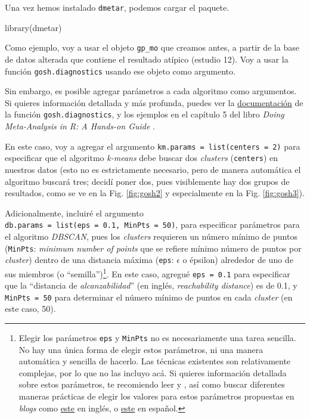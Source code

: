 \documentclass[
  bookmarksnumbered]{article}
\newenvironment{Shaded}{\begin{snugshade}}{\end{snugshade}}
\newcommand{\FunctionTok}[1]{\textcolor[rgb]{0.39,0.29,0.61}{#1}}
\newcommand{\NormalTok}[1]{\textcolor[rgb]{0.12,0.11,0.11}{#1}}
\begin{document}
Una vez hemos instalado \texttt{dmetar}, podemos cargar el paquete.

\begin{Shaded}
\begin{Highlighting}[]
\FunctionTok{library}\NormalTok{(dmetar)}
\end{Highlighting}
\end{Shaded}

Como ejemplo, voy a usar el objeto \texttt{gp\_mo} que creamos antes, a partir de la base de datos alterada que contiene el resultado atípico (estudio 12). Voy a usar la función \texttt{gosh.diagnostics} usando ese objeto como argumento.

Sin embargo, es posible agregar parámetros a cada algoritmo como argumentos. Si quieres información detallada y más profunda, puedes ver la \href{https://dmetar.protectlab.org/reference/gosh.diagnostics}{documentación} de la función \texttt{gosh.diagnostics}, y los ejemplos en el capítulo 5 del libro \emph{Doing Meta-Analysis in R: A Hands-on Guide} \autocite{harrer2021doing}.

En este caso, voy a agregar el argumento \texttt{km.params\ =\ list(centers\ =\ 2)} para especificar que el algoritmo \emph{k-means} debe buscar dos \emph{clusters} (\texttt{centers}) en nuestros datos (esto no es estrictamente necesario, pero de manera automática el algoritmo buscará tres; decidí poner dos, pues visiblemente hay dos grupos de resultados, como se ve en la Fig. \ref{fig:gosh2} y especialmente en la Fig. \ref{fig:gosh3}).

Adicionalmente, incluiré el argumento \texttt{db.params\ =\ list(eps\ =\ 0.1,\ MinPts\ =\ 50)}, para especificar parámetros para el algoritmo \emph{DBSCAN}, pues los \emph{clusters} requieren un número mínimo de puntos (\texttt{MinPts}: \emph{minimum number of points} que se refiere mínimo número de puntos por \emph{cluster}) dentro de una distancia máxima (\texttt{eps}: \(\epsilon\) o épsilon) alrededor de uno de sus miembros (o ``semilla'')\footnote{Elegir los parámetros \texttt{eps} y \texttt{MinPts} no es necesariamente una tarea sencilla. No hay una única forma de elegir estos parámetros, ni una manera automática y sencilla de hacerlo. Las técnicas existentes son relativamente complejas, por lo que no las incluyo acá. Si quieres información detallada sobre estos parámetros, te recomiendo leer \textcite{esterAlgorithm} y \textcite{schubertDBSCANRevisitedRevisited2017}, así como buscar diferentes maneras prácticas de elegir los valores para estos parámetros propuestas en \emph{blogs} como \href{https://www.datanovia.com/en/lessons/dbscan-density-based-clustering-essentials/}{este} en inglés, o \href{http://exponentis.es/parametrizacion-automatica-de-dbscan-en-r-a-partir-de-la-curva-elbow}{este} en español.}. En este caso, agregué \texttt{eps\ =\ 0.1} para especificar que la ``distancia de \emph{alcanzabilidad}'' (en inglés, \emph{reachability distance}) es de 0.1, y \texttt{MinPts\ =\ 50} para determinar el número mínimo de puntos en cada \emph{cluster} (en este caso, 50).
\end{document}
